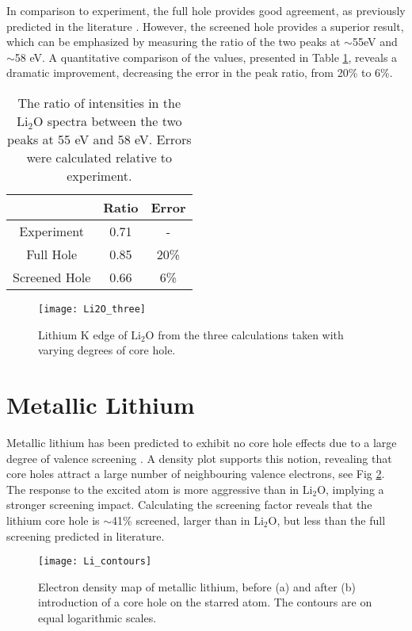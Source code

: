 In comparison to experiment, the full hole provides good agreement, as previously predicted in the literature \cite{mauchamp_ab_2006}. However, the screened hole provides a superior result, which can be emphasized by measuring the ratio of the two peaks at $\sim$55eV and $\sim$58 eV.  A quantitative comparison of the values, presented in Table \ref{ratio}, reveals a dramatic improvement, decreasing the error in the peak ratio, from 20\% to  6\%.  

\begin{table}[H]
	\centering
		\caption{The ratio of intensities in the $\mathrm{Li_2O}$ spectra between the two peaks at 55 eV and 58 eV.  Errors were calculated relative to experiment.   }
	
	\begin{tabular}{ccc}
		& Ratio & Error \\
		\hline
		Experiment & 0.71 & -  \\
		Full Hole & 0.85 & 20\%  \\
		Screened Hole & 0.66 & 6\%  \\
		
	\end{tabular}
\label{ratio}
\end{table}




\begin{figure}
	\centering
	\texttt{[image: Li2O\_three]}
	\caption{Lithium K edge of $ \mathrm{Li_2O} $ from the three calculations taken with varying degrees of core hole. }
	\label{Li2O_three}
\end{figure}

\section{Metallic Lithium}
Metallic lithium has been predicted to exhibit no core hole effects due to a large degree of valence screening \cite{rez_theory_2008}. A density plot supports this notion, revealing that core  holes attract a large number of neighbouring valence electrons, see Fig \ref{Li_countours}.  The response to the excited atom is more aggressive than in $ \mathrm{Li_2O} $, implying a stronger screening impact.  Calculating the screening factor  reveals that the lithium core hole is  $ \sim$41\% screened, larger than in $ \mathrm{Li_2O} $, but less than the full screening predicted in literature. 
\\


\begin{figure}
	\centering
	\texttt{[image: Li\_contours]}
	\caption{Electron density map of metallic lithium, before (a) and after (b) introduction of a core hole on the starred atom.  The contours are on equal logarithmic scales.}
	\label{Li_countours}
\end{figure}





